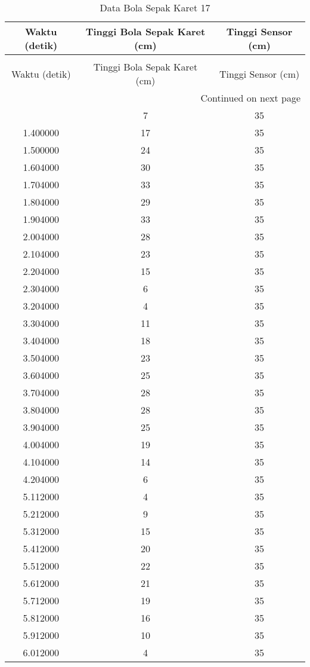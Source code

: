 \begin{longtable}[htbp]{|c|c|c|}
\caption{Data Bola Sepak Karet 17} \\
\hline
Waktu (detik) & Tinggi Bola Sepak Karet (cm) & Tinggi Sensor (cm) \\ \hline
\endfirsthead
\caption[]{Data Bola Sepak Karet 17} \\
\hline
Waktu (detik) & Tinggi Bola Sepak Karet (cm) & Tinggi Sensor (cm) \\ \hline
\endhead
\multicolumn{3}{r}{Continued on next page} \\
\endfoot
\endlastfoot
1.300000 & 7 & 35 \\ \hline
1.400000 & 17 & 35 \\ \hline
1.500000 & 24 & 35 \\ \hline
1.604000 & 30 & 35 \\ \hline
1.704000 & 33 & 35 \\ \hline
1.804000 & 29 & 35 \\ \hline
1.904000 & 33 & 35 \\ \hline
2.004000 & 28 & 35 \\ \hline
2.104000 & 23 & 35 \\ \hline
2.204000 & 15 & 35 \\ \hline
2.304000 & 6 & 35 \\ \hline
3.204000 & 4 & 35 \\ \hline
3.304000 & 11 & 35 \\ \hline
3.404000 & 18 & 35 \\ \hline
3.504000 & 23 & 35 \\ \hline
3.604000 & 25 & 35 \\ \hline
3.704000 & 28 & 35 \\ \hline
3.804000 & 28 & 35 \\ \hline
3.904000 & 25 & 35 \\ \hline
4.004000 & 19 & 35 \\ \hline
4.104000 & 14 & 35 \\ \hline
4.204000 & 6 & 35 \\ \hline
5.112000 & 4 & 35 \\ \hline
5.212000 & 9 & 35 \\ \hline
5.312000 & 15 & 35 \\ \hline
5.412000 & 20 & 35 \\ \hline
5.512000 & 22 & 35 \\ \hline
5.612000 & 21 & 35 \\ \hline
5.712000 & 19 & 35 \\ \hline
5.812000 & 16 & 35 \\ \hline
5.912000 & 10 & 35 \\ \hline
6.012000 & 4 & 35 \\ \hline
\end{longtable}
